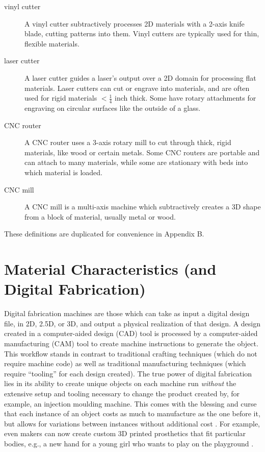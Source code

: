 \begin{description}
\item[vinyl cutter] A vinyl cutter subtractively processes 2D materials with a 2-axis knife blade, cutting patterns into them. Vinyl cutters are typically used for thin, flexible materials.

\item[laser cutter] A laser cutter guides a laser's output over a 2D domain for processing flat materials. Laser cutters can cut or engrave into materials, and are often used for rigid materials $<\frac{1}{4}$ inch thick. Some have rotary attachments for engraving on circular surfaces like the outside of a glass.

\item[CNC router] A CNC router uses a 3-axis rotary mill to cut through thick, rigid materials, like wood or certain metals. Some CNC routers are portable and can attach to many materials, while some are stationary with beds into which material is loaded.

\item[CNC mill] A CNC mill is a multi-axis machine which subtractively creates a 3D shape from a block of material, usually metal or wood.

\end{description}

These definitions are duplicated for convenience in Appendix B.

\section{Material Characteristics (and Digital Fabrication)}

Digital fabrication machines are those which can take as input a digital design file, in 2D, 2.5D, or 3D, and output a physical realization of that design. A design created in a computer-aided design (CAD) tool is processed by a computer-aided manufacturing (CAM) tool to create machine instructions to generate the object. This workflow stands in contrast to traditional crafting techniques (which do not require machine code) as well as traditional manufacturing techniques (which require ``tooling'' for each design created). The true power of digital fabrication lies in its ability to create unique objects on each machine run \emph{without} the extensive setup and tooling necessary to change the product created by, for example, an injection moulding machine. This comes with the blessing and curse that each instance of an object costs as much to manufacture as the one before it, but allows for variations between instances without additional cost \cite{wright-manufacturing}. For example, even makers can now create custom 3D printed prosthetics that fit particular bodies, e.g., a new hand for a young girl who wants to play on the playground \cite{myers-sophie}.


